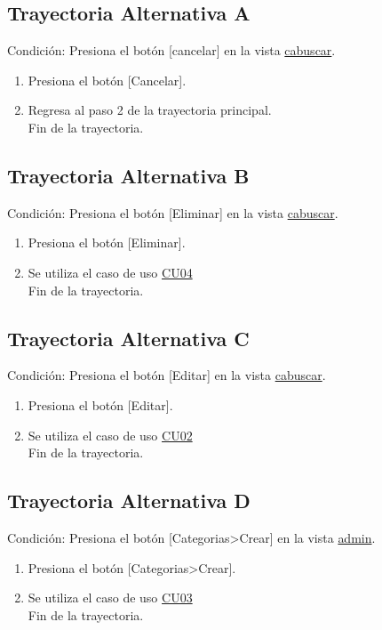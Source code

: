 	\subsection {Trayectoria Alternativa A}
		Condici\'on: Presiona el bot\'on [cancelar] en la vista \hyperlink{cabuscar}{cabuscar}.
			\\
		\begin{enumerate}
			\item \UCactor Presiona el bot\'on [Cancelar].
			\item \UCsist Regresa al paso 2 de la trayectoria principal.
			\\
			Fin de la trayectoria.
			\\
		\end{enumerate}
		
	\subsection {Trayectoria Alternativa B}
		Condici\'on: Presiona el bot\'on [Eliminar] en la vista \hyperlink{cabuscar}{cabuscar}.
			\\
		\begin{enumerate}
			\item \UCactor Presiona el bot\'on [Eliminar].
			\item Se utiliza el caso de uso \hyperlink{CU04}{CU04}
			\\
			Fin de la trayectoria.
			\\
		\end{enumerate}
		
	\subsection {Trayectoria Alternativa C}
		Condici\'on: Presiona el bot\'on [Editar] en la vista \hyperlink{cabuscar}{cabuscar}.
			\\
		\begin{enumerate}
			\item \UCactor Presiona el bot\'on [Editar].
			\item Se utiliza el caso de uso \hyperlink{CU02}{CU02}
			\\
			Fin de la trayectoria.
			\\
		\end{enumerate}
		
	\subsection {Trayectoria Alternativa D}
		Condici\'on: Presiona el bot\'on [Categorias>Crear] en la vista \hyperlink{admin}{admin}.
			\\
		\begin{enumerate}
			\item \UCactor Presiona el bot\'on [Categorias>Crear].
			\item Se utiliza el caso de uso \hyperlink{CU03}{CU03}
			\\
			Fin de la trayectoria.
			\\
		\end{enumerate}